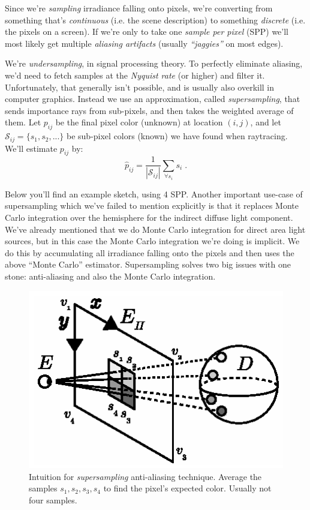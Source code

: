 \documentclass[a4paper, twocolumn]{article}
\begin{document}
            Since we're \emph{sampling} irradiance falling onto pixels, we're converting from something that's \emph{continuous} (i.e. the scene description) to something \emph{discrete} (i.e. the pixels on a screen). If we're only to take one \emph{sample per pixel} (SPP) we'll most likely get multiple \emph{aliasing artifacts} (usually \emph{``jaggies''} on most edges).

            We're \emph{undersampling}, in signal processing theory. To perfectly eliminate aliasing, we'd need to fetch samples at the \emph{Nyquist rate} (or higher) and filter it. Unfortunately, that generally isn't possible, and is usually also overkill in computer graphics. Instead we use an approximation, called \emph{supersampling}, that sends importance rays from sub-pixels, and then takes the weighted average of them. Let \(p_{ij}\) be the final pixel color (unknown) at location \((i,j)\), and let \(\mathcal{S}_{ij} = \{s_1, s_2, ...\}\) be sub-pixel colors (known) we have found when raytracing. We'll estimate \(p_{ij}\) by: \[\hat{p}_{ij} = \frac{1}{|\mathcal{S}_{ij}|}\sum_{\forall s_i } s_i \; .\]

            Below you'll find an example sketch, using 4 SPP. Another important use-case of supersampling which we've failed to mention explicitly is that it replaces Monte Carlo integration over the hemisphere for the indirect diffuse  light component. We've already mentioned that we do Monte Carlo integration for direct area light sources, but in this case the Monte Carlo integration we're doing is implicit. We do this by accumulating all irradiance falling onto the pixels and then uses the above ``Monte Carlo'' estimator. Supersampling solves two big issues with one stone: anti-aliasing and also the Monte Carlo integration.

            \begin{figure}[ht]
                \centering
                \includegraphics[width=0.8\linewidth]{share/supersampling.eps}
                \caption{Intuition for \emph{supersampling} anti-aliasing technique. Average the samples \(s_1, s_2, s_3, s_4\) to find the pixel's expected color. Usually not four samples.}
                \label{fig:supersampling}
            \end{figure}
\end{document}
